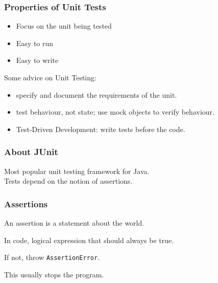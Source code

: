 \begin{frame}
\frametitle{Properties of Unit Tests}
\begin{changemargin}{1cm}
\begin{itemize}
	\item Focus on the unit being tested 
	\item Easy to run 
	\item Easy to write 
\end{itemize}

Some advice on Unit Testing:

\begin{itemize}
\item specify and document the requirements of the unit.
\item test behaviour, not state; use mock objects to verify behaviour.
\item Test-Driven Development: write tests before the code.
\end{itemize}

\end{changemargin}
\end{frame}


\begin{frame}
\frametitle{About JUnit}

\begin{changemargin}{1cm}
\large

Most popular unit testing framework for Java.\\[1em]

Tests depend on the notion of \alert{assertions}.

\end{changemargin}

\end{frame}

\begin{frame}
\frametitle{Assertions}
\begin{changemargin}{1cm}

An assertion is a statement about the world.

In code, logical expression that should always be true.

If not, throw \texttt{AssertionError}.

This usually stops the program. 

\end{changemargin}

\end{frame}



